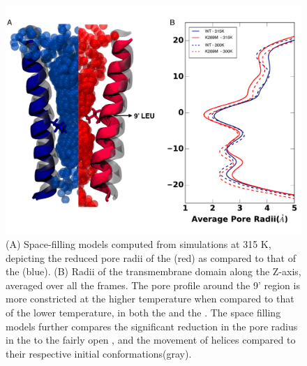 \documentclass[9pt,twocolumn,twoside,lineno]{pnas-new}
\begin{document}


\begin{figure}
\begin{center}
\includegraphics[width = .5\textwidth]{figures/pore_radd_fill.pdf}
\end{center}
\caption{(A) Space-filling models computed from simulations at 315 K, depicting the reduced pore radii of the \MT(red) as compared to that of the \WT(blue). (B) Radii of the transmembrane domain along the Z-axis, averaged over all the frames. The pore profile around the 9' region is more constricted at the higher temperature when compared to that of the lower temperature, in both the \WT and the \MT. The space filling models further compares the significant reduction in the pore radius in the \MT to the fairly open \WT, and the movement of helices compared to their respective initial conformations(gray).}
\label{fig:pore-profile}
\end{figure}
\end{document}
